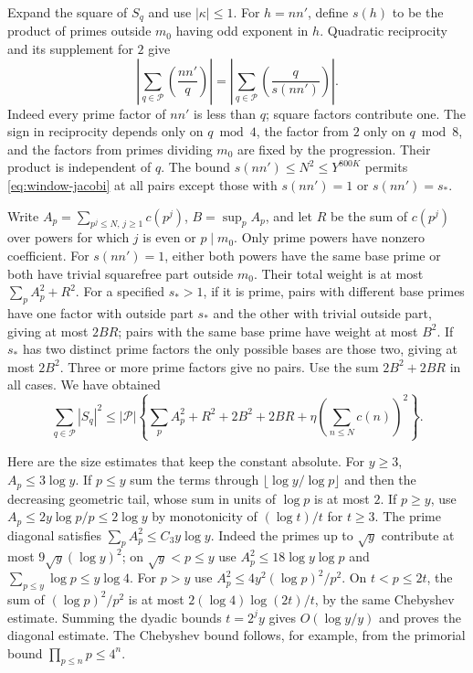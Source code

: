 Expand the square of \(S_q\) and use \(|\kappa|\le1\).
For \(h=nn'\), define \(s(h)\) to be the product of primes
outside \(m_0\) having odd exponent in \(h\).
Quadratic reciprocity and its supplement for \(2\) give
\[
 \left|\sum_{q\in\mathcal P}\left(\frac{nn'}q\right)\right|
     =\left|\sum_{q\in\mathcal P}\left(\frac{q}{s(nn')}\right)\right|.
\]
Indeed every prime factor of \(nn'\) is less than \(q\);
square factors contribute one. The sign in reciprocity depends
only on \(q\bmod4\), the factor from \(2\) only on \(q\bmod8\),
and the factors from primes dividing \(m_0\) are fixed by the
progression. Their product is independent of \(q\).
The bound \(s(nn')\le N^2\le Y^{800K}\) permits
\eqref{eq:window-jacobi} at all pairs except those with
\(s(nn')=1\) or \(s(nn')=s_*\).

Write \(A_p=\sum_{p^j\le N,\,j\ge1}c(p^j)\),
\(B=\sup_p A_p\), and let \(R\) be the sum of \(c(p^j)\)
over powers for which \(j\) is even or \(p\mid m_0\).
Only prime powers have nonzero coefficient.
For \(s(nn')=1\), either both powers have the same base prime or
both have trivial squarefree part outside \(m_0\). Their total
weight is at most \(\sum_p A_p^2+R^2\).
For a specified \(s_*>1\), if it is prime, pairs with different
base primes have one factor with outside part \(s_*\) and the
other with trivial outside part, giving at most \(2BR\); pairs
with the same base prime have weight at most \(B^2\).
If \(s_*\) has two distinct prime factors the only possible
bases are those two, giving at most \(2B^2\).
Three or more prime factors give no pairs.
Use the sum \(2B^2+2BR\) in all cases. We have obtained
\begin{equation}
 \sum_{q\in\mathcal P}|S_q|^2\le|\mathcal P|
 \left\{\sum_p A_p^2+R^2+2B^2+2BR+
                      \eta\left(\sum_{n\le N}c(n)\right)^2\right\}.
 \label{eq:window-pair-split}
\end{equation}

Here are the size estimates that keep the constant absolute.
For \(y\ge3\), \(A_p\le3\log y\). If \(p\le y\) sum the terms
through \(\lfloor\log y/\log p\rfloor\) and then the decreasing
geometric tail, whose sum in units of \(\log p\) is at most \(2\).
If \(p\ge y\), use \(A_p\le 2y\log p/p\le2\log y\) by
monotonicity of \((\log t)/t\) for \(t\ge3\).
The prime diagonal satisfies
\(\sum_p A_p^2\le C_3 y\log y\). Indeed the primes up to
\(\sqrt y\) contribute at most \(9\sqrt y(\log y)^2\);
on \(\sqrt y<p\le y\) use
\(A_p^2\le18\log y\log p\) and
\(\sum_{p\le y}\log p\le y\log4\).
For \(p>y\) use \(A_p^2\le4y^2(\log p)^2/p^2\).
On \(t<p\le2t\), the sum of \((\log p)^2/p^2\) is at most
\(2(\log4)\log(2t)/t\), by the same Chebyshev estimate. Summing
the dyadic bounds \(t=2^j y\) gives \(O(\log y/y)\) and proves
the diagonal estimate. The Chebyshev bound follows, for example,
from the primorial bound \(\prod_{p\le n}p\le4^n\).

